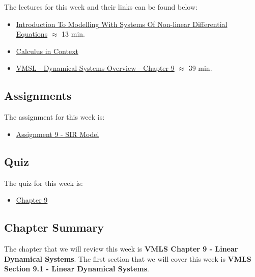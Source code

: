The lectures for this week and their links can be found below:

\begin{itemize}
    \item \href{https://applied.cs.colorado.edu/mod/hvp/view.php?id=50773}{Introduction To Modelling With Systems Of Non-linear Differential Equations} $\approx$ 13 min.
    \item \href{https://scholarworks.smith.edu/textbooks/2/}{Calculus in Context}
    \item \href{https://www.youtube.com/watch?v=NS0jvPLtgGc}{VMSL - Dynamical Systems Overview - Chapter 9} $\approx$ 39 min.
\end{itemize}

\subsection{Assignments}

The assignment for this week is:

\begin{itemize}
    \item \href{https://github.com/QuantumCompiler/CU/tree/main/CSPB%202820%20-%20Linear%20Algebra%20With%20Computer%20Science%20Applications/Assignments/Assignment%209%20-%20SIR%20Model}{Assignment 9 - SIR Model}
\end{itemize}

\subsection{Quiz}

The quiz for this week is:

\begin{itemize}
    \item \href{https://applied.cs.colorado.edu/mod/quiz/view.php?id=50777}{Chapter 9}
\end{itemize}

\subsection{Chapter Summary}

The chapter that we will review this week is \textbf{VMLS Chapter 9 - Linear Dynamical Systems}. The first section that we will cover this week is \textbf{VMLS Section 9.1 - Linear Dynamical Systems}.

